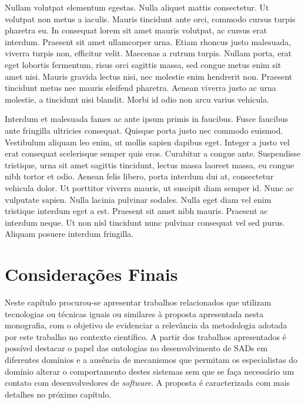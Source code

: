 Nullam volutpat elementum egestas. Nulla aliquet mattis consectetur. Ut volutpat non metus a iaculis. Mauris tincidunt ante orci, commodo cursus turpis pharetra eu. In consequat lorem sit amet mauris volutpat, ac cursus erat interdum. Praesent sit amet ullamcorper urna. Etiam rhoncus justo malesuada, viverra turpis non, efficitur velit. Maecenas a rutrum turpis. Nullam porta, erat eget lobortis fermentum, risus orci sagittis massa, sed congue metus enim sit amet nisi. Mauris gravida lectus nisi, nec molestie enim hendrerit non. Praesent tincidunt metus nec mauris eleifend pharetra. Aenean viverra justo ac urna molestie, a tincidunt nisi blandit. Morbi id odio non arcu varius vehicula.

Interdum et malesuada fames ac ante ipsum primis in faucibus. Fusce faucibus ante fringilla ultricies consequat. Quisque porta justo nec commodo euismod. Vestibulum aliquam leo enim, ut mollis sapien dapibus eget. Integer a justo vel erat consequat scelerisque semper quis eros. Curabitur a congue ante. Suspendisse tristique, urna sit amet sagittis tincidunt, lectus massa laoreet massa, eu congue nibh tortor et odio. Aenean felis libero, porta interdum dui at, consectetur vehicula dolor. Ut porttitor viverra mauris, ut suscipit diam semper id. Nunc ac vulputate sapien. Nulla lacinia pulvinar sodales. Nulla eget diam vel enim tristique interdum eget a est. Praesent sit amet nibh mauris. Praesent ac interdum neque. Ut non nisl tincidunt nunc pulvinar consequat vel sed purus. Aliquam posuere interdum fringilla.

\section{Considerações Finais}
% 
% 
	Neste capítulo procurou-se apresentar trabalhos relacionados que utilizam tecnologias ou técnicas iguais ou similares à proposta apresentada nesta monografia, com o objetivo de evidenciar a relevância da metodologia adotada por este trabalho no contexto científico. A partir dos trabalhos apresentados é possível destacar o papel das ontologias no desenvolvimento de SADs em diferentes domínios e a ausência de mecanismos que permitam os especialistas do domínio alterar o comportamento destes sistemas sem que se faça necessário um contato com desenvolvedores de \textit{software}. A proposta é caracterizada com mais detalhes no próximo capítulo.